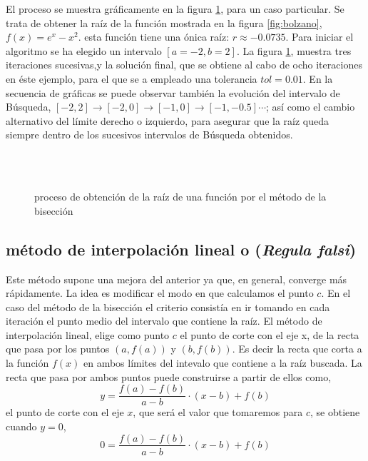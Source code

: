 El proceso se muestra gráficamente en la figura \ref{fig:bisec}, para un caso particular. Se trata de obtener la raíz de la función mostrada en la figura \ref{fig:bolzano}, $f(x)=e^x-x^2$. esta función tiene una ónica raíz: $r\approx -0.0735$. Para iniciar el algoritmo se ha elegido un intervalo $[a=-2,b=2]$. La figura \ref{fig:bisec}, muestra tres iteraciones sucesivas,y la solución final, que se obtiene al cabo de ocho iteraciones en éste ejemplo, para el que se a empleado una tolerancia $tol=0.01$. En la secuencia de gráficas se puede observar también la evolución del intervalo de Búsqueda, $[-2, 2]\rightarrow [-2, 0] \rightarrow [-1, 0] \rightarrow [-1, -0.5] \cdots$; así como el cambio alternativo del límite derecho o izquierdo, para asegurar que la raíz queda siempre dentro de los sucesivos intervalos de Búsqueda obtenidos. 
\begin{figure}
\centering
{} \qquad
{}\\
\qquad
{}\\

\caption{proceso de obtención de la raíz de una función por el método de la bisección }
\label{fig:bisec}
\end{figure}

\subsection{método de interpolación lineal o (\emph{Regula falsi})}
Este método supone una mejora del anterior ya que, en general,  converge más rápidamente. La idea es modificar el modo en que calculamos el punto $c$. En el caso del método de la bisección el criterio consistía en ir tomando en cada iteración el punto medio del intervalo que contiene la raíz. El método de interpolación lineal, elige como punto $c$ el punto de corte con el eje x, de la recta que pasa por los puntos $\left(a,f(a)\right)$ y $\left(b,f(b)\right)$. Es decir la recta que corta a la función $f(x)$ en ambos límites del intevalo que contiene a la raíz buscada. La recta que pasa por ambos puntos puede construirse a partir de ellos como,
\begin{equation*}
y=\frac{f(a)-f(b)}{a-b}\cdot(x-b)+f(b)
\end{equation*}
el punto de corte con el eje $x$, que será el valor que tomaremos para $c$, se obtiene cuando $y=0$,
\begin{equation*}
0=\frac{f(a)-f(b)}{a-b}\cdot(x-b)+f(b)
\end{equation*}

